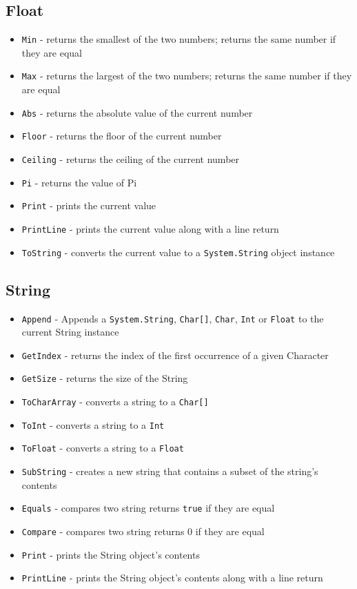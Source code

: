 \documentclass[12pt]{article}
\begin{document}
\subsection{Float}
\begin{itemize}
    \item \texttt{Min} - returns the smallest of the two numbers; returns the same number if they are equal
    \item \texttt{Max} - returns the largest of the two numbers; returns the same number if they are equal
    \item \texttt{Abs} - returns the absolute value of the current number
    \item \texttt{Floor} - returns the floor of the current number
    \item \texttt{Ceiling} - returns the ceiling of the current number
    \item \texttt{Pi} - returns the value of Pi
    \item \texttt{Print} - prints the current value
    \item \texttt{PrintLine} - prints the current value along with a line return
    \item \texttt{ToString} - converts the current value to a \texttt{System.String} object instance
\end{itemize}

\subsection{String}
\begin{itemize}
    \item \texttt{Append} - Appends a \texttt{System.String}, \texttt{Char[]}, \texttt{Char}, \texttt{Int} or \texttt{Float} to the current String instance
    \item \texttt{GetIndex} - returns the index of the first occurrence of a given Character
    \item \texttt{GetSize} - returns the size of the String
    \item \texttt{ToCharArray} - converts a string to a \texttt{Char[]}
    \item \texttt{ToInt} - converts a string to a \texttt{Int}
    \item \texttt{ToFloat} - converts a string to a \texttt{Float}
    \item \texttt{SubString} - creates a new string that contains a subset of the string's contents
    \item \texttt{Equals} - compares two string returns \texttt{true} if they are equal
    \item \texttt{Compare} - compares two string returns 0 if they are equal
    \item \texttt{Print} - prints the String object's contents
    \item \texttt{PrintLine} - prints the String object's contents along with a line return
\end{itemize}
\end{document}
